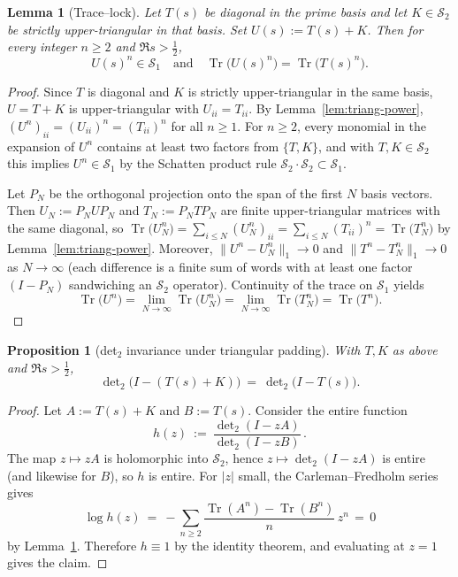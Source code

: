\documentclass[11pt]{article}
\newtheorem{proposition}[theorem]{Proposition}
\newtheorem{lemma}[theorem]{Lemma}
\theoremstyle{definition}
\theoremstyle{remark}
\newcommand{\HS}{\mathcal{S}_2}
\DeclareMathOperator{\Tr}{Tr}
\begin{document}
\begin{lemma}[Trace--lock]\label{lem:tracelock}
Let $T(s)$ be diagonal in the prime basis and let $K\in\HS$ be strictly upper-triangular in that basis. Set $U(s):=T(s)+K$. Then for every integer $n\ge 2$ and $\Re s>\tfrac12$,
\[
  U(s)^n\in\mathcal S_1\quad\text{and}\quad \Tr\big(U(s)^n\big)=\Tr\big(T(s)^n\big).
\]
\end{lemma}
\begin{proof}
Since $T$ is diagonal and $K$ is strictly upper-triangular in the same basis, $U=T+K$ is upper-triangular with $U_{ii}=T_{ii}$. By Lemma~\ref{lem:triang-power}, $(U^n)_{ii}=(U_{ii})^n=(T_{ii})^n$ for all $n\ge 1$. For $n\ge 2$, every monomial in the expansion of $U^n$ contains at least two factors from $\{T,K\}$, and with $T,K\in\HS$ this implies $U^n\in\mathcal S_1$ by the Schatten product rule $\mathcal S_2\cdot\mathcal S_2\subset\mathcal S_1$.

Let $P_N$ be the orthogonal projection onto the span of the first $N$ basis vectors. Then $U_N:=P_N U P_N$ and $T_N:=P_N T P_N$ are finite upper-triangular matrices with the same diagonal, so $\Tr\big(U_N^n\big)=\sum_{i\le N}(U_N^n)_{ii}=\sum_{i\le N}(T_{ii})^n=\Tr\big(T_N^n\big)$ by Lemma~\ref{lem:triang-power}. Moreover, $\|U^n-U_N^n\|_1\to 0$ and $\|T^n-T_N^n\|_1\to 0$ as $N\to\infty$ (each difference is a finite sum of words with at least one factor $(I-P_N)$ sandwiching an $\HS$ operator). Continuity of the trace on $\mathcal S_1$ yields
\[
  \Tr\big(U^n\big)=\lim_{N\to\infty}\Tr\big(U_N^n\big)=\lim_{N\to\infty}\Tr\big(T_N^n\big)=\Tr\big(T^n\big).
\]
\end{proof}

\begin{proposition}[det$_2$ invariance under triangular padding]\label{prop:det2-invariance}
With $T, K$ as above and $\Re s>\tfrac12$,
\[
  \det\nolimits_2\!\big(I-(T(s)+K)\big)\ =\ \det\nolimits_2\!\big(I-T(s)\big).
\]
\end{proposition}
\begin{proof}
Let $A:=T(s)+K$ and $B:=T(s)$. Consider the entire function
\[
  h(z)\ :=\ \frac{\det\nolimits_2(I-zA)}{\det\nolimits_2(I-zB)}\,.
\]
The map $z\mapsto zA$ is holomorphic into $\HS$, hence $z\mapsto \det\nolimits_2(I-zA)$ is entire (and likewise for $B$), so $h$ is entire. For $|z|$ small, the Carleman--Fredholm series gives
\[
  \log h(z)\ =\ -\sum_{n\ge 2}\frac{\Tr(A^n)-\Tr(B^n)}{n}\,z^n\,=\,0
\]
by Lemma~\ref{lem:tracelock}. Therefore $h\equiv 1$ by the identity theorem, and evaluating at $z=1$ gives the claim.
\end{proof}
\end{document}
